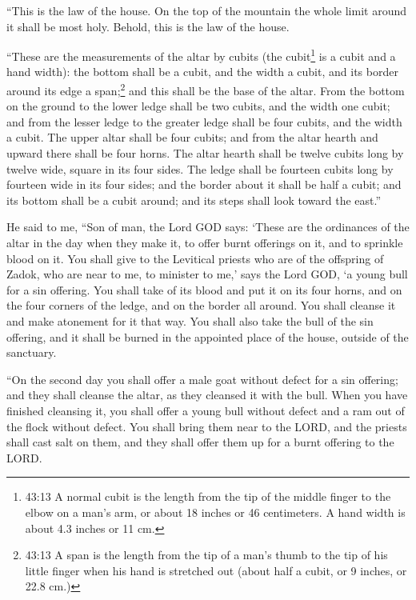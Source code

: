 \myverse{}“This is the law of the house. On the top of the mountain the
whole limit around it shall be most holy. Behold, this is the law of the house.

\myverse{}“These are the measurements of the altar by cubits (the cubit\footnote{43:13 A normal cubit is the length from the tip of the middle finger to the elbow on a man’s arm, or
	about 18 inches or 46 centimeters. A hand width is about 4.3 inches or 11 cm.} is a cubit and
a hand width): the bottom shall be a cubit, and the width a cubit, and its border around its edge a span;\footnote{43:13 A span is the length from the tip of a man’s thumb to the tip of his little finger when his hand
	is stretched out (about half a cubit, or 9 inches, or 22.8 cm.)} and this shall be the base of
the altar.
\myverse{}From the bottom on the ground to the lower ledge shall be two cubits, and
the width one cubit; and from the lesser ledge to the greater ledge shall be four cubits, and the width
a cubit.
\myverse{}The upper altar shall be four cubits; and from the altar hearth and upward
there shall be four horns.
\myverse{}The altar hearth shall be twelve cubits long by twelve wide, square in its
four sides.
\myverse{}The ledge shall be fourteen cubits long by fourteen wide in its four sides;
and the border about it shall be half a cubit; and its bottom shall be a cubit around; and its steps shall
look toward the east.”

\myverse{}He said to me, “Son of man, the Lord GOD says: ‘These are the
ordinances of the altar in the day when they make it, to offer burnt offerings on it, and to sprinkle
blood on it.
\myverse{}You shall give to the Levitical priests who are of the offspring of Zadok,
who are near to me, to minister to me,’ says the Lord GOD, ‘a young bull for a sin offering.
\myverse{}You shall take of its blood and put it on its four horns, and on the four
corners of the ledge, and on the border all around. You shall cleanse it and make atonement for it that
way.
\myverse{}You shall also take the bull of the sin offering, and it shall be burned
in the appointed place of the house, outside of the sanctuary.

\myverse{}“On the second day you shall offer a male goat without defect
for a sin offering; and they shall cleanse the altar, as they cleansed it with the bull.
\myverse{}When you have finished cleansing it, you shall offer a young bull without
defect and a ram out of the flock without defect.
\myverse{}You shall bring them near to the LORD, and the priests shall cast salt on
them, and they shall offer them up for a burnt offering to the LORD.

